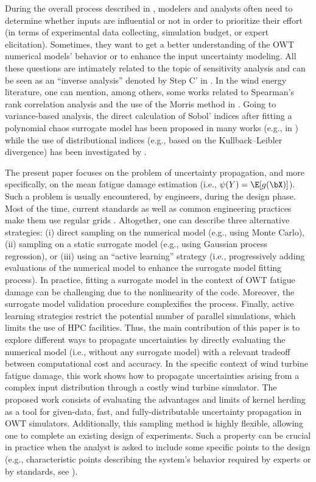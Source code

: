 During the overall process described in , modelers and analysts often need to determine whether inputs are influential or not in order to prioritize their effort (in terms of experimental data collecting, simulation budget, or expert elicitation). 
Sometimes, they want to get a better understanding of the OWT numerical models' behavior or to enhance the input uncertainty modeling. 
All these questions are intimately related to the topic of sensitivity analysis \citep{saltelli_2008,daveiga_iooss_2021} and can be seen as an ``inverse analysis'' denoted by Step C' in . 
In the wind energy literature, one can mention, among others, some works related to Spearman's rank correlation analysis and the use of the Morris method in \cite{verlade_kramhoft_2019,petrovska_2022}. 
Going to variance-based analysis, the direct calculation of Sobol' indices after fitting a polynomial chaos surrogate model has been proposed in many works (e.g., in \cite{murcia_dimitrov_2018}) while the use of distributional indices (e.g., based on the Kullback–Leibler divergence) has been investigated by \cite{teixeira_2019}. 
 
The present paper focuses on the problem of uncertainty propagation, and more specifically, on the mean fatigue damage estimation (i.e., $\psi(Y) = \E[g(\bX)]$). 
Such a problem is usually encountered, by engineers, during the design phase. 
Most of the time, current standards as well as common engineering practices make them use regular grids \citep{huchet_2019}. 
Altogether, one can describe three alternative strategies: (i) direct sampling on the numerical model (e.g., using Monte Carlo), (ii) sampling on a static surrogate model (e.g., using Gaussian process regression), or (iii) using an ``active learning'' strategy (i.e., progressively adding evaluations of the numerical model to enhance the surrogate model fitting process). 
In practice, fitting a surrogate model in the context of OWT fatigue damage can be challenging due to the nonlinearity of the code. 
Moreover, the surrogate model validation procedure complexifies the process. 
Finally, active learning strategies restrict the potential number of parallel simulations, which limits the use of HPC facilities. 
Thus, the main contribution of this paper is to explore different ways to propagate uncertainties by directly evaluating the numerical model (i.e., without any surrogate model) with a relevant tradeoff between computational cost and accuracy. 
In the specific context of wind turbine fatigue damage, this work shows how to propagate uncertainties arising from a complex input distribution through a costly wind turbine simulator. 
The proposed work consists of evaluating the advantages and limits of kernel herding as a tool for given-data, fast, and fully-distributable uncertainty propagation in OWT simulators. 
Additionally, this sampling method is highly flexible, allowing one to complete an existing design of experiments. 
Such a property can be crucial in practice when the analyst is asked to include some specific points to the design (e.g., characteristic points describing the system's behavior required by experts or by standards, see \cite{huchet_2019}). 

